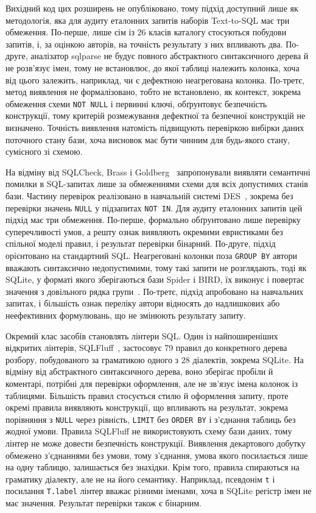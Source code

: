 \documentclass[a4paper,14pt,oneside]{extreport}
\begin{document}
Вихідний код цих розширень не опубліковано, тому підхід доступний лише як методологія, яка для аудиту еталонних запитів наборів Text-to-SQL має три обмеження. По-перше, лише сім із 26 класів каталогу стосуються побудови запитів, і, за оцінкою авторів, на точність результату з них впливають два. По-друге, аналізатор sqlparse не будує повного абстрактного синтаксичного дерева й не розв'язує імен, тому не встановлює, до якої таблиці належить колонка, хоча від цього залежить, наприклад, чи є дефектною неагрегована колонка. По-третє, метод виявлення не формалізовано, тобто не встановлено, як контекст, зокрема обмеження схеми \texttt{NOT~NULL} і первинні ключі, обґрунтовує безпечність конструкції, тому критерій розмежування дефектної та безпечної конструкцій не визначено. Точність виявлення натомість підвищують перевіркою вибірки даних поточного стану бази, хоча висновок має бути чинним для будь-якого стану, сумісного зі схемою.

На відміну від SQLCheck, Brass і Goldberg~\cite{brass2006semantic} запропонували виявляти семантичні помилки в SQL-запитах лише за обмеженнями схеми для всіх допустимих станів бази. Частину перевірок реалізовано в навчальній системі DES~\cite{saenz2019clp,desSystem}, зокрема без перевірки значень \texttt{NULL} у підзапитах \texttt{NOT~IN}. Для аудиту еталонних запитів цей підхід має три обмеження. По-перше, формально обґрунтовано лише перевірку суперечливості умов, а решту ознак виявляють окремими евристиками без спільної моделі правил, і результат перевірки бінарний. По-друге, підхід орієнтовано на стандартний SQL. Неагреговані колонки поза \texttt{GROUP~BY} автори вважають синтаксично недопустимими, тому такі запити не розглядають, тоді як SQLite, у форматі якого зберігаються бази Spider і BIRD, їх виконує і повертає значення з довільного рядка групи~\cite{sqliteBareColumns}. По-третє, підхід апробовано на навчальних запитах, і більшість ознак переліку автори відносять до надлишкових або неефективних формулювань, що не змінюють результату запиту.

Окремий клас засобів становлять лінтери SQL. Один із найпоширеніших відкритих лінтерів, SQLFluff~\cite{sqlfluff}, застосовує 79 правил до конкретного дерева розбору, побудованого за граматикою одного з 28 діалектів, зокрема SQLite. На відміну від абстрактного синтаксичного дерева, воно зберігає пробіли й коментарі, потрібні для перевірки оформлення, але не зв'язує імена колонок із таблицями. Більшість правил стосується стилю й оформлення запиту, проте окремі правила виявляють конструкції, що впливають на результат, зокрема порівняння з \texttt{NULL} через рівність, \texttt{LIMIT} без \texttt{ORDER~BY} і з'єднання таблиць без жодної умови. Правила SQLFluff не використовують схему бази даних, тому лінтер не може довести безпечність конструкції. Виявлення декартового добутку обмежено з'єднаннями без умови, тому з'єднання, умова якого посилається лише на одну таблицю, залишається без знахідки. Крім того, правила спираються на граматику діалекту, але не на його семантику. Наприклад, псевдонім \texttt{t} і посилання \texttt{T.label} лінтер вважає різними іменами, хоча в SQLite регістр імен не має значення. Результат перевірки також є бінарним.
\end{document}
